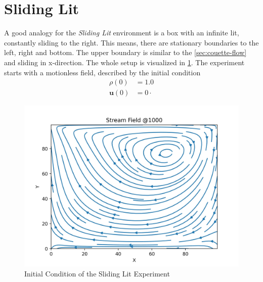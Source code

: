 \section{Sliding Lit}\label{sec:sliding-lit}
A good analogy for the \textit{Sliding Lit} environment is a box with an infinite lit, constantly sliding to the right.
This means, there are stationary boundaries to the left, right and bottom.
The upper boundary is similar to the \cref{sec:couette-flow} and sliding in x-direction.
The whole setup is visualized in \cref{fig:sl-initial-condition}.
The experiment starts with a motionless field, described by the initial condition
\begin{equation*}
    \begin{aligned}
        \rho(0) &= 1.0 \\
        \mathbf{u}(0) &= 0 \cdot
    \end{aligned}
\end{equation*}

\begin{figure}[H]
    \begin{center}
        \includegraphics[width=0.5\linewidth]{graphs/SlidingLit/initial_condition}
        \caption{Initial Condition of the Sliding Lit Experiment}
        \label{fig:sl-initial-condition}
    \end{center}
\end{figure}

